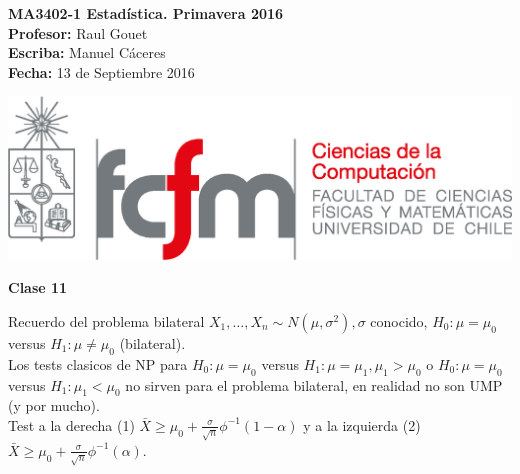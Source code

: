 \documentclass[10pt]{article}
\theoremstyle{plain}
\theoremstyle{definition}
\newcommand{\catnum}{11} %
\newcommand{\fecha}{13 de Septiembre 2016 }
\begin{document}
\vspace*{-1.2 cm}
\begin{minipage}{0.6\textwidth}
\begin{flushleft}
\hspace*{-0.5cm}\textbf{MA3402-1 Estadística. Primavera 2016}\\
\hspace*{-0.5cm}\textbf{Profesor:} Raul Gouet\\
\hspace*{-0.5cm}\textbf{Escriba:} Manuel Cáceres\\
\hspace*{-0.5cm}\textbf{Fecha:} \fecha
\end{flushleft}
\end{minipage}
\begin{minipage}{0.36\textwidth}
\begin{flushright}
\includegraphics[scale=0.3]{imagenes/fcfm_dcc}
\end{flushright}
\end{minipage}
\bigskip

\begin{center}
\LARGE\textbf{Clase \catnum}
\end{center}
Recuerdo del problema bilateral $X_{1},\ldots,X_{n} \sim N(\mu,\sigma^2), \sigma$ conocido, $H_{0}: \mu=\mu_{0}$ versus $H_{1}: \mu \not = \mu_{0}$ (bilateral).\\

Los tests clasicos de NP para $H_{0}: \mu=\mu_{0}$ versus $H_{1}: \mu=\mu_{1}, \mu_{1}>\mu_{0}$ o $H_{0}: \mu=\mu_{0}$ versus $H_{1}: \mu_{1}<\mu_{0}$ no sirven para el problema bilateral, en realidad no son UMP (y por mucho).\\

Test a la derecha (1) $\bar{X} \ge \mu_{0} + \frac{\sigma}{\sqrt{n}}\phi^{-1}(1-\alpha)$ y a la izquierda (2) $\bar{X} \ge \mu_{0} + \frac{\sigma}{\sqrt{n}}\phi^{-1}(\alpha)$.\\
\end{document}
